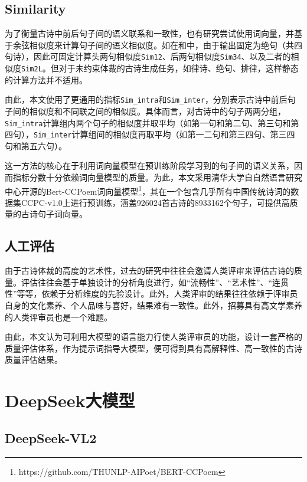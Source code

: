 \subsection{Similarity}
为了衡量古诗中前后句子间的语义联系和一致性，也有研究尝试使用词向量，并基于余弦相似度来计算句子间的语义相似度。\cite{dengIterativePolishingFramework2020}如在\cite{chenPolishingModelMachineGenerated2024}和\cite{dengIterativePolishingFramework2020}中，由于输出固定为绝句（共四句诗），因此可固定计算头两句相似度\verb|Sim12|、后两句相似度\verb|Sim34|、以及二者的相似度\verb|Sim2L|。但对于未约束体裁的古诗生成任务，如律诗、绝句、排律，这样静态的计算方法并不适用。

由此，本文使用了更通用的指标\verb|Sim_intra|和\verb|Sim_inter|，分别表示古诗中前后句子间的相似度和不同联之间的相似度。具体而言，对古诗中的句子两两分组，\verb|Sim_intra|计算组内两个句子的相似度并取平均（如第一句和第二句、第三句和第四句），\verb|Sim_inter|计算组间的相似度再取平均（如第一二句和第三四句、第三四句和第五六句）。

这一方法的核心在于利用词向量模型在预训练阶段学习到的句子间的语义关系，因而指标分数十分依赖词向量模型的质量。为此，本文采用清华大学自自然语言研究中心开源的Bert-CCPoem词向量模型\footnote{https://github.com/THUNLP-AIPoet/BERT-CCPoem}，其在一个包含几乎所有中国传统诗词的数据集CCPC-v1.0上进行预训练，涵盖926024首古诗的8933162个句子，可提供高质量的古诗句子词向量。

\subsection{人工评估}

由于古诗体裁的高度的艺术性，过去的研究中往往会邀请人类评审来评估古诗的质量。评估往往会基于单独设计的分析角度进行，如“流畅性”、“艺术性”、“连贯性”等等，依赖于分析维度的先验设计。此外，人类评审的结果往往依赖于评审员自身的文化素养、个人品味与喜好，结果难有一致性。此外，招募具有高文学素养的人类评审员也是一个难题。

由此，本文认为可利用大模型的语言能力行使人类评审员的功能，设计一套严格的质量评估体系，作为提示词指导大模型，便可得到具有高解释性、高一致性的古诗质量评估结果。


\section{DeepSeek大模型}

\subsection{DeepSeek-VL2}

